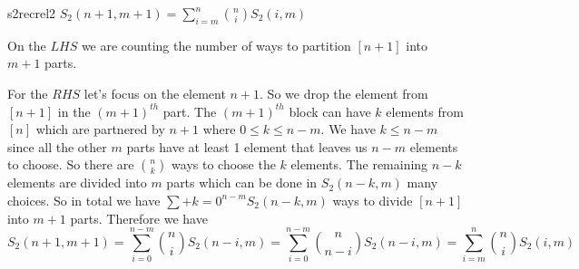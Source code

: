 \begin{Theorem}{}{s2recrel2}
	$S_2(n+1,m+1)= \displaystyle\sum\limits_{i=m}^n  \binom{n}{i}  S_2(i,m)$
\end{Theorem}
\begin{combi-proof}
On the $LHS$ we are counting the number of ways to partition $[n+1]$ into $m+1$ parts. 

For the $RHS$ let's focus on the element $n+1$. So we drop the element from $[n+1]$ in the $(m+1)^{th}$ part. The $(m+1)^{th}$ block can have $k$ elements from $[n]$ which are partnered by $n+1$ where $0\leq k\leq n-m$. We have $k\leq n-m$ since all the other $m$ parts have at least 1 element that leaves us $n-m$ elements to choose. So there are $\binom{n}{k}$ ways to choose the $k$ elements. The remaining $n-k$ elements are divided into $m$ parts which can be done in $S_2(n-k,m)$ many choices. So in total we have $\sum\limits+{k=0}^{n-m}S_2(n-k,m)$ ways to divide $[n+1]$ into $m+1$ parts. Therefore we have $$S_2(n+1,m+1)=\sum\limits_{i=0}^{n-m}\binom{n}{i}S_2(n-i,m)=\sum\limits_{i=0}^{n-m}\binom{n}{n-i}S_2(n-i,m)=\sum\limits_{i=m}^{n}\binom{n}{i}S_2(i,m)$$
\end{combi-proof}
